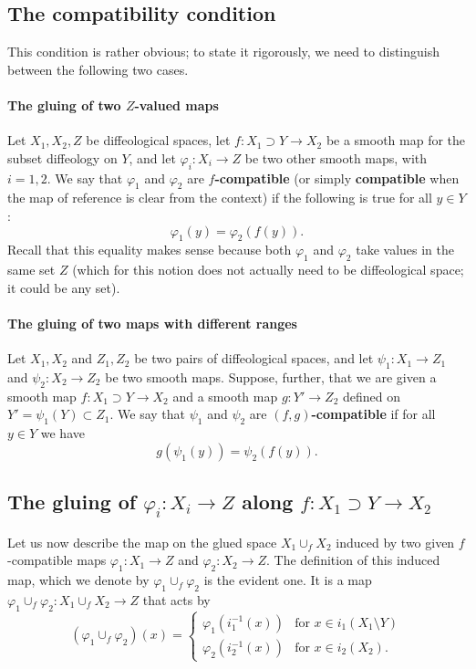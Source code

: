 \documentclass{article}
\begin{document}
\subsection{The compatibility condition}\label{f-g:compatibility:sect}

This condition is rather obvious; to state it rigorously, we need to distinguish between the following two cases.

\paragraph{The gluing of two $Z$-valued maps} Let $X_1,X_2,Z$ be diffeological spaces, let $f:X_1\supset Y\to X_2$ be a smooth map for the subset diffeology on $Y$, and let $\varphi_i:X_i\to Z$ be
two other smooth maps, with $i=1,2$. We say that $\varphi_1$ and $\varphi_2$ are \textbf{$f$-compatible} (or simply \textbf{compatible} when the map of reference is clear from the context) if the following is 
true for all $y\in Y$:
$$\varphi_1(y)=\varphi_2(f(y)).$$ Recall that this equality makes sense because both $\varphi_1$ and $\varphi_2$ take values in the same set $Z$ (which for this notion does not actually need to be 
diffeological space; it could be any set).

\paragraph{The gluing of two maps with different ranges} Let $X_1,X_2$ and $Z_1,Z_2$ be two pairs of diffeological spaces, and let $\psi_1:X_1\to Z_1$ and $\psi_2:X_2\to Z_2$ be two smooth maps.
Suppose, further, that we are given a smooth map $f:X_1\supset Y\to X_2$ and a smooth map $g:Y'\to Z_2$ defined on $Y'=\psi_1(Y)\subset Z_1$. We say that $\psi_1$ and $\psi_2$ are
\textbf{$(f,g)$-compatible} if for all $y\in Y$ we have  $$g(\psi_1(y))=\psi_2(f(y)).$$


\subsection{The gluing of $\varphi_i:X_i\to Z$ along $f:X_1\supset Y\to X_2$}\label{f-gluing:of:maps:sect}

Let us now describe the map on the glued space $X_1\cup_f X_2$ induced by two given $f$-compatible maps $\varphi_1:X_1\to Z$ and $\varphi_2:X_2\to Z$. The definition of this induced map, which we
denote by $\varphi_1\cup_f\varphi_2$ is the evident one. It is a map $\varphi_1\cup_f\varphi_2:X_1\cup_f X_2\to Z$ that acts by
$$(\varphi_1\cup_f\varphi_2)(x)=\left\{\begin{array}{ll} \varphi_1(i_1^{-1}(x)) & \mbox{for }x\in i_1(X_1\setminus Y)\\ \varphi_2(i_2^{-1}(x)) & \mbox{for }x\in i_2(X_2).\end{array}\right.$$
\end{document}
